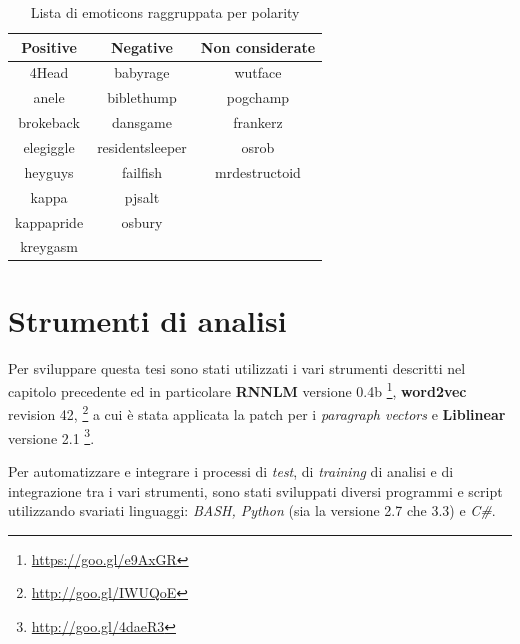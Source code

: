 \documentclass[a4paper,12pt,openright,twoside]{report}
\theoremstyle{definition}
\begin{document}
\begin{table}[H]
\begin{center}
\begin{tabular}{|c|c|c|}
\hline
Positive & Negative & Non considerate \\
\hline
4Head & babyrage & wutface \\
\hline
anele &  biblethump &  pogchamp \\
\hline
brokeback &  dansgame & frankerz \\
\hline
elegiggle & residentsleeper &  osrob \\
\hline
heyguys & failfish & mrdestructoid \\
\hline
kappa & pjsalt & \\
\hline
kappapride & osbury & \\
\hline
kreygasm &  & \\
\hline
\end{tabular}
\end{center}
\caption{Lista di emoticons raggruppata per polarity}
\label{tab:emoticons2}
\end{table}

  
\section{Strumenti di analisi}
Per sviluppare questa tesi sono stati utilizzati i vari strumenti descritti 
nel capitolo precedente
ed in particolare \textbf{RNNLM} versione 0.4b \footnote{\url{https://goo.gl/e9AxGR}}, 
\textbf{word2vec} revision 42, \footnote{\url{http://goo.gl/IWUQoE}}
a cui è stata applicata la patch per i \emph{paragraph vectors} e \textbf{Liblinear} versione 2.1 \footnote{\url{http://goo.gl/4daeR3}}.

Per automatizzare e integrare i processi di \emph{test}, di
\emph{training} di analisi e di integrazione tra i vari strumenti,
sono stati sviluppati diversi programmi e script utilizzando svariati linguaggi: \emph{BASH, Python} (sia 
la versione 2.7 che 3.3) e \emph{C\#}.
\end{document}
